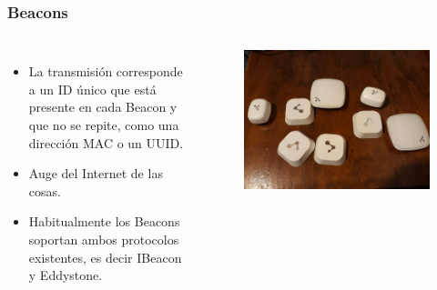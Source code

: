 \documentclass[handout]{beamer}
\begin{document}
\begin{frame}
\frametitle{Beacons}

\begin{columns}[t] %


\begin{itemize}
\item La transmisión corresponde a un ID único que está presente en cada Beacon y que no se repite, como una dirección MAC o un UUID.

\item Auge del Internet de las cosas.

\item Habitualmente los Beacons soportan ambos protocolos existentes, es decir IBeacon y Eddystone.

\end{itemize}

\begin{figure}
\includegraphics[width=\textwidth]{../figures/beacons_all.jpg}

\end{figure}

\end{columns}

\end{frame}

\end{document}

